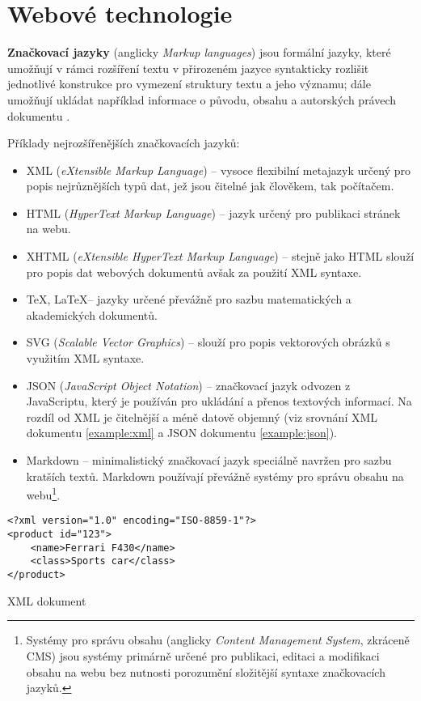 \chapter{Webové technologie}
\label{chap:languages}

\textbf{Značkovací jazyky} (anglicky \textit{Markup languages}) jsou formální jazyky, které umožňují v rámci rozšíření textu v přirozeném jazyce syntakticky rozlišit jednotlivé konstrukce pro vymezení struktury textu a jeho významu; dále umožňují ukládat například informace o původu, obsahu a autorských právech dokumentu \cite{modern-markup}.

Příklady nejrozšířenějších značkovacích jazyků:

\begin{itemize}
    \item XML (\textit{eXtensible Markup Language}) -- vysoce flexibilní metajazyk určený pro popis nejrůznějších typů dat, jež jsou čitelné jak člověkem, tak počítačem.
    \item HTML (\textit{HyperText Markup Language}) -- jazyk určený pro publikaci stránek na webu.
    \item XHTML (\textit{eXtensible HyperText Markup Language}) -- stejně jako HTML slouží pro popis dat webových dokumentů avšak za použití XML syntaxe.
    \item \TeX, \LaTeX -- jazyky určené převážně pro sazbu matematických a akademických dokumentů.
    \item SVG (\textit{Scalable Vector Graphics}) -- slouží pro popis vektorových obrázků s využitím XML syntaxe.
    \item JSON (\textit{JavaScript Object Notation}) -- značkovací jazyk odvozen z JavaScriptu, který je používán pro ukládání a přenos textových informací. Na rozdíl od XML je čitelnější a méně datově objemný (viz srovnání XML dokumentu \ref{example:xml} a JSON dokumentu \ref{example:json}).
    \item Markdown -- minimalistický značkovací jazyk speciálně navržen pro sazbu kratších textů. Markdown používají převážně systémy pro správu obsahu na webu\footnote{Systémy pro správu obsahu (anglicky \textit{Content Management System}, zkráceně CMS) jsou systémy primárně určené pro publikaci, editaci a modifikaci obsahu na webu bez nutnosti porozumění složitější syntaxe značkovacích jazyků.}.
\end{itemize}

\begin{example}
    \centering
    \begin{lstlisting}
<?xml version="1.0" encoding="ISO-8859-1"?>
<product id="123">
    <name>Ferrari F430</name>
    <class>Sports car</class>
</product>
    \end{lstlisting}
    \caption{XML dokument}
    \label{example:xml}
\end{example}

